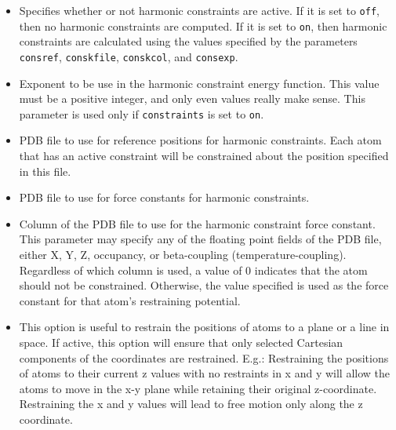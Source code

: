 \begin{itemize}

\item
{}
{Specifies whether or not harmonic constraints are active.  If it 
is set to {\tt off}, then no harmonic constraints are computed.  
If it is set to {\tt on}, then 
harmonic constraints are calculated using the values specified 
by the parameters {\tt consref}, {\tt conskfile}, {\tt conskcol}, 
and {\tt consexp}.}

\item
{}
{Exponent to be use in the harmonic constraint energy function.  
This value must be a positive integer, and only even values really make 
sense.  This parameter is used only if {\tt constraints} is set to 
{\tt on}.}

\item
{}
{PDB file to use for reference positions for harmonic constraints.  
Each atom that has an active constraint will be constrained about 
the position specified in this file.}

\item
{}
{PDB file to use for force constants for 
harmonic constraints.}

\item
{}
{Column of the PDB file to use for the harmonic constraint force constant.
This parameter may specify any of the floating point fields of the PDB file, 
either X, Y, Z, occupancy, or beta-coupling (temperature-coupling).  
Regardless of which column is used, a value of 0 indicates that the atom 
should not be constrained.  
Otherwise, the value specified is used as the force constant for 
that atom's restraining potential.}

\item
{}
{This option is useful to restrain the positions of atoms to a plane or a line in space. If active,
 this option will ensure that only selected Cartesian components of the coordinates are restrained.
 E.g.: Restraining the positions of atoms to their current z values with no restraints
 in x and y will allow the atoms to move in the x-y plane while retaining their original z-coordinate.
 Restraining the x and y values will lead to free motion only along the z coordinate.}


\end{itemize}
